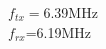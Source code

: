 \documentclass[preview]{standalone}
\begin{document}
\begin{center}
$f_{tx}=$6.39MHz\\$f_{rx}$=6.19MHz
\end{center}
\end{document}
